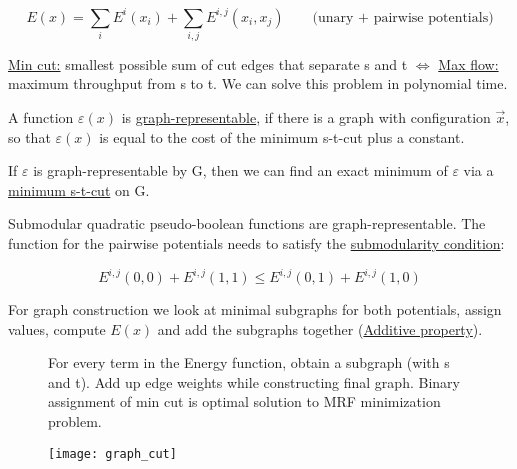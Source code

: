 \[E(x) = \sum_i E^i(x_i) + \sum_{i,j} E^{i,j} (x_i, x_j) \qquad \text{(unary + pairwise potentials)}\]

\underline{Min cut:} smallest possible sum of cut edges that separate s and t $\Leftrightarrow$ \underline{Max flow:} maximum throughput from s to t. We can solve this problem in polynomial time.

A function $\varepsilon(x)$ is \underline{graph-representable}, if there is a graph with configuration $\vec{x}$, so that $\varepsilon(x)$ is equal to the cost of the minimum s-t-cut plus a constant.

If $\varepsilon$ is  graph-representable by G, then we can find an exact minimum of $\varepsilon$ via a \underline{minimum s-t-cut} on G.

Submodular quadratic pseudo-boolean functions are graph-representable. The function for the pairwise potentials needs to satisfy the \underline{submodularity condition}:

\[E^{i,j}(0,0) + E^{i,j}(1,1) \leq E^{i,j}(0,1) + E^{i,j}(1,0)\]

For graph construction we look at minimal subgraphs for both potentials, assign values, compute $E(x)$ and add the subgraphs together (\underline{Additive property}).

\begin{figure}[H]
	\centering
	\begin{minipage}[b]{0.5\textwidth}
		For every term in the Energy function, obtain a subgraph (with s and t). Add up edge weights while constructing final graph. Binary assignment of min cut is optimal solution to MRF minimization problem.
	\end{minipage}
	\begin{minipage}[b]{0.4\textwidth}
		\texttt{[image: graph\_cut]}
	\end{minipage}
\end{figure}